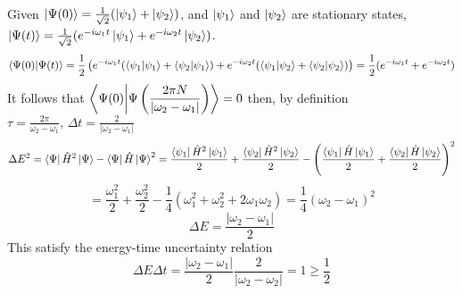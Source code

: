 \begin{sol}
Given $\ket{\Psi(0)}=\frac{1}{\sqrt{2}}(\ket{\psi_1}+\ket{\psi_2})$, and $\ket{\psi_1}$ and $\ket{\psi_2}$ are stationary states, $\ket{\Psi(t)}=\frac{1}{\sqrt{2}}(e^{-i\omega_1t}\ket{\psi_1}+e^{-i\omega_2t}\ket{\psi_2})$.
$$\braket{\Psi(0)}{\Psi(t)}=\frac{1}{2}\left(e^{-i\omega_1t}(\braket{\psi_1}{\psi_1}+\braket{\psi_2}{\psi_1})+e^{-i\omega_2t}(\braket{\psi_1}{\psi_2}+\braket{\psi_2}{\psi_2})\right)=\frac{1}{2}(e^{-i\omega_1t}+e^{-i\omega_2t})$$ 
It follows that $\displaystyle{\braket{\Psi(0)}{\Psi\left(\frac{2\pi N}{|\omega_2-\omega_1|}\right)}=0}$ then, by definition $\displaystyle{\tau=\frac{2\pi}{\omega_2-\omega_1},\,\Delta t=\frac{2}{|\omega_2-\omega_1|}}$
$$\Delta E^2=\bra\Psi\hat H^2\ket\Psi-\bra\Psi\hat H\ket\Psi^2=\frac{\bra{\psi_1}\hat H^2\ket{\psi_1}}{2}+\frac{\bra{\psi_2}\hat H^2\ket{\psi_2}}{2}-\left(\frac{\bra{\psi_1}\hat H\ket{\psi_1}}{2}+\frac{\bra{\psi_2}\hat H\ket{\psi_2}}{2}\right)^2$$
$$=\frac{\omega_1^2}{2}+\frac{\omega_2^2}{2}-\frac{1}{4}(\omega_1^2+\omega_2^2+2\omega_1\omega_2)=\frac{1}{4}(\omega_2-\omega_1)^2$$
$$\Delta E=\frac{|\omega_2-\omega_1|}{2}$$
This satisfy the energy-time uncertainty relation 
$$\Delta E\Delta t=\frac{|\omega_2-\omega_1|}{2}\frac{2}{|\omega_2-\omega_2|}=1\geq \frac{1}{2}$$
\end{sol}